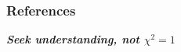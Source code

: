 \documentclass[aspectratio=169]{beamer}
\begin{document}
\begin{markdown}



\begin{frame}
\renewcommand{\bibfont}{\footnotesize}
\frametitle{\huge{\textbf{References}}}




\end{frame}


\begin{frame}{}
  \centering \Huge
  \textbf{\emph{Seek understanding, not $\chi^2=1$}}
\end{frame}


\end{markdown}
\end{document}
